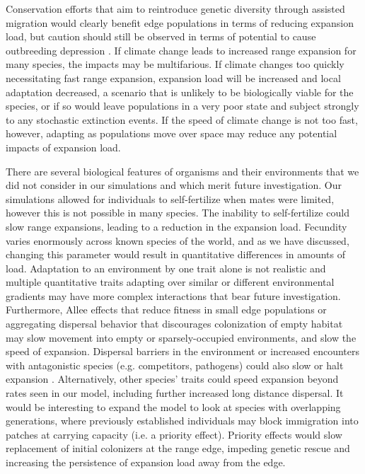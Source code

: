 Conservation efforts that aim to reintroduce genetic diversity through assisted migration would clearly benefit edge populations in terms of reducing expansion load, but caution should still be observed in terms of potential to cause outbreeding depression \citep{Aitken:2013}. If climate change leads to increased range expansion for many species, the impacts may be multifarious. If climate changes too quickly necessitating fast range expansion, expansion load will be increased and local adaptation decreased, a scenario that is unlikely to be biologically viable for the species, or if so would leave populations in a very poor state and subject strongly to any stochastic extinction events. If the speed of climate change is not too fast, however, adapting as populations move over space may reduce any potential impacts of expansion load. 

There are several biological features of organisms and their environments that we did not consider in our simulations and which merit future investigation. Our simulations allowed for individuals to self-fertilize when mates were limited, however this is not possible in many species. The inability to self-fertilize could slow range expansions, leading to a reduction in the expansion load. Fecundity varies enormously across known species of the world, and as we have discussed, changing this parameter would result in quantitative differences in amounts of load. Adaptation to an environment by one trait alone is not realistic and multiple quantitative traits adapting over similar or different environmental gradients may have more complex interactions that bear future investigation. Furthermore, Allee effects that reduce fitness in small edge populations \citep{Taylor:2005} or aggregating dispersal behavior that discourages colonization of empty habitat \citep{Altwegg:2013} may slow movement into empty or sparsely-occupied environments, and slow the speed of expansion. Dispersal barriers in the environment or increased encounters with antagonistic species (e.g. competitors, pathogens) could also slow or halt expansion \citep{Case:2005, Kubisch:2013}. Alternatively, other species' traits could speed expansion beyond rates seen in our model, including further increased long distance dispersal. It would be interesting to expand the model to look at species with overlapping generations, where previously established individuals may block immigration into patches at carrying capacity (i.e. a priority effect). Priority effects would slow replacement of initial colonizers at the range edge, impeding genetic rescue and increasing the persistence of expansion load away from the edge. 

